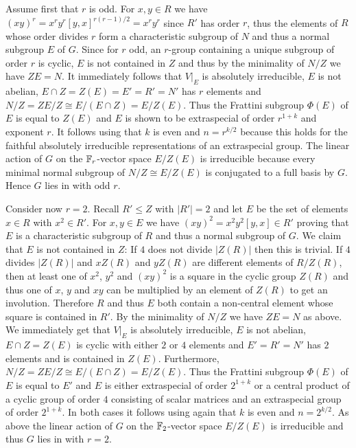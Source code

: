 Assume first that $r$ is odd. For $x,y \in R$ we have $(xy)^r =
x^ry^r[y,x]^{r(r-1)/2} = x^ry^r$ since $R'$ has order $r$, thus the
elements of $R$ whose order divides $r$ form a characteristic 
subgroup of $N$ and thus a normal subgroup $E$ of $G$. Since for
$r$ odd, an $r$-group containing a unique subgroup of order $r$ is
cyclic, $E$ is not contained in $Z$ and thus by the minimality
of $N/Z$ we have $Z E = N$. It immediately follows that $V|_E$
is absolutely irreducible, $E$ is not abelian, 
$E \cap Z = Z(E) = E' = R' = N'$ has $r$ elements and 
$N/Z = ZE/Z \cong E/(E \cap Z) = E/Z(E)$. Thus the Frattini subgroup
$\Phi(E)$ of $E$ is equal to $Z(E)$ and $E$ is shown to be extraspecial
of order $r^{1+k}$ and exponent $r$. It follows using
\cite[V.16.14]{Hup} that $k$ is even and
$n=r^{k/2}$ because this holds for the faithful absolutely irreducible
representations of an extraspecial group. The linear action of $G$ on
the $\mathbb{F}_r$-vector space $E/Z(E)$ is irreducible because every minimal
normal subgroup of $N/Z \cong E/Z(E)$ is conjugated to a full basis by
$G$. Hence $G$ lies in  with odd $r$.

Consider now $r=2$. Recall $R' \le Z$ with $|R'| = 2$ and
let $E$ be the set of elements $x \in R$ with $x^2 \in R'$. 
For $x,y \in E$ we have $(xy)^2 = x^2y^2[y,x] \in R'$ proving that
$E$ is a characteristic subgroup of $R$ and thus a normal subgroup of
$G$. We claim that $E$ is not contained in $Z$: If $4$ does not divide
$|Z(R)|$ then this is trivial. If $4$ divides $|Z(R)|$ and $xZ(R)$ and $yZ(R)$
are different elements of $R/Z(R)$, then at least one of
$x^2$, $y^2$ and $(xy)^2$ is a square in the cyclic group $Z(R)$ and
thus one of $x$, $y$ and $xy$ can be multiplied by an element of
$Z(R)$ to get an involution. Therefore $R$ and thus $E$ both contain a 
non-central element whose square is contained in $R'$.
By the minimality of $N/Z$ we have $Z E = N$ as above. We immediately
get that $V|_E$ is absolutely irreducible, $E$ is not abelian,
$E \cap Z = Z(E)$ is cyclic with either $2$ or $4$ elements and
$E' = R' = N'$ has $2$ elements and is contained in $Z(E)$.
Furthermore, $N/Z = ZE/Z \cong E/(E \cap Z) = E/Z(E)$. Thus the
Frattini subgroup $\Phi(E)$ of $E$ is equal to $E'$ and $E$ is either
extraspecial of order $2^{1+k}$ or a central product of a cyclic group
of order $4$ consisting of scalar matrices and an extraspecial group 
of order $2^{1+k}$. In both cases it follows using
\cite[V.16.14]{Hup} again that $k$ is even and
$n = 2^{k/2}$. As above the linear action of $G$ on the $\mathbb{F}_2$-vector space
$E/Z(E)$ is irreducible and thus $G$ lies in  with $r=2$.

